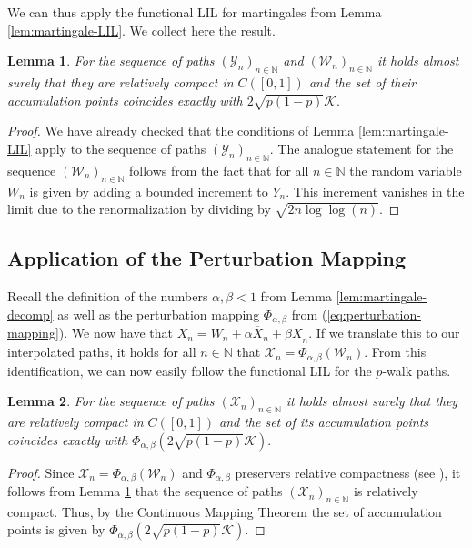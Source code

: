 \documentclass[11pt]{article}
\newtheorem{lemma}{Lemma}[section]
\theoremstyle{remark}
\newcommand{\N}{\mathbb{N}}
\begin{document}
We can thus apply the functional LIL for martingales from Lemma \ref{lem:martingale-LIL}. We collect here the result.

\begin{lemma}\label{lem:martingale-term-convergence}
    For the sequence of paths  $(\mathcal{Y}_n)_{n\in\N}$ and $(\mathcal{W}_n)_{n\in\N}$ it holds almost surely that they are relatively compact in $C([0,1])$ and the set of their accumulation points coincides exactly with $2\sqrt{p(1-p)}\mathcal{K}.$
\end{lemma}
\begin{proof}
    We have already checked that the conditions of Lemma \ref{lem:martingale-LIL} apply to the sequence of paths $(\mathcal{Y}_n)_{n\in\N}$. The analogue statement for the sequence $(\mathcal{W}_n)_{n\in\N}$ follows from the fact that for all $n\in\N$ the random variable $W_n$ is given by adding a bounded increment to $Y_n$. This increment vanishes in the limit due to the renormalization by dividing by $\sqrt{2n\log\log(n)}$.
\end{proof}
\subsection{Application of the Perturbation Mapping}
Recall the definition of the numbers $\alpha,\beta<1$ from Lemma \ref{lem:martingale-decomp} as well as the perturbation mapping $\Phi_{\alpha,\beta}$ from (\ref{eq:perturbation-mapping}). We now have that
$X_n=W_n+\alpha\overline{X}_n+\beta\underline{X}_n.$
If we translate this to our interpolated paths, it holds for all $n\in\N$ that $\mathcal{X}_n=\Phi_{\alpha,\beta}(\mathcal{W}_n).$ From this identification, we can now easily follow the functional LIL for the $p$-walk paths.

\begin{lemma}\label{lem:functional-LIL-p-walk}
    For the sequence of paths $(\mathcal{X}_n)_{n\in\N}$ it holds almost surely that they are relatively compact in $C([0,1])$ and the set of its accumulation points coincides exactly with $\Phi_{\alpha,\beta}(2\sqrt{p(1-p)}\mathcal{K}).$
\end{lemma}
\begin{proof}
    Since $\mathcal{X}_n=\Phi_{\alpha,\beta}(\mathcal{W}_n)$ and $\Phi_{\alpha,\beta}$ preservers relative compactness (see \cite[Lemma 2.1.]{D96}), it follows from Lemma \ref{lem:martingale-term-convergence} that the sequence of paths $(\mathcal{X}_n)_{n\in\N}$ is relatively compact. Thus, by the Continuous Mapping Theorem the set of accumulation points is given by $\Phi_{\alpha,\beta}(2\sqrt{p(1-p)}\mathcal{K}).$
\end{proof}
\end{document}
